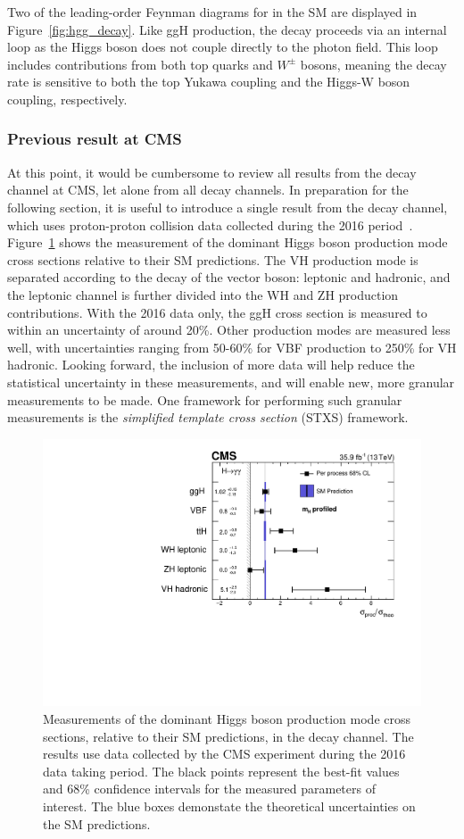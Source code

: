 Two of the leading-order Feynman diagrams for \Hgg in the SM are displayed in Figure~\ref{fig:hgg_decay}. Like ggH production, the \Hgg decay proceeds via an internal loop as the Higgs boson does not couple directly to the photon field. This loop includes contributions from both top quarks and $W^{\pm}$ bosons, meaning the \Hgg decay rate is sensitive to both the top Yukawa coupling and the Higgs-W boson coupling, respectively.

\subsubsection{Previous \Hgg result at CMS}
At this point, it would be cumbersome to review all results from the \Hgg decay channel at CMS, let alone from all decay channels. In preparation for the following section, it is useful to introduce a single result from the \Hgg decay channel, which uses proton-proton collision data collected during the 2016 period~\cite{Sirunyan:2018ouh}. Figure~\ref{fig:hig16040_stage0} shows the measurement of the dominant Higgs boson production mode cross sections relative to their SM predictions. The VH production mode is separated according to the decay of the vector boson: leptonic and hadronic, and the leptonic channel is further divided into the WH and ZH production contributions. With the 2016 data only, the ggH cross section is measured to within an uncertainty of around 20\%. Other production modes are measured less well, with uncertainties ranging from 50-60\% for VBF production to 250\% for VH hadronic. Looking forward, the inclusion of more data will help reduce the statistical uncertainty in these measurements, and will enable new, more granular measurements to be made. One framework for performing such granular measurements is the \textit{simplified template cross section} (STXS) framework.

\begin{figure}[htb!]
  \centering
  \includegraphics[width=.7\linewidth]{Figures/theory/hig16040_stage0.pdf}
  \caption[Measurements of Higgs boson production cross section in the \Hgg channel, using the 2016 data set]
  {
    Measurements of the dominant Higgs boson production mode cross sections, relative to their SM predictions, in the \Hgg decay channel. The results use data collected by the CMS experiment during the 2016 data taking period. The black points represent the best-fit values and 68\% confidence intervals for the measured parameters of interest. The blue boxes demonstate the theoretical uncertainties on the SM predictions.
  }
  \label{fig:hig16040_stage0}
\end{figure}

